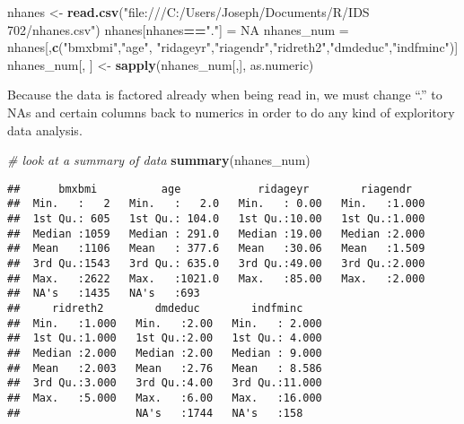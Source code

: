 \documentclass[]{article}
\newenvironment{Shaded}{\begin{snugshade}}{\end{snugshade}}
\newcommand{\KeywordTok}[1]{\textcolor[rgb]{0.13,0.29,0.53}{\textbf{#1}}}
\newcommand{\StringTok}[1]{\textcolor[rgb]{0.31,0.60,0.02}{#1}}
\newcommand{\CommentTok}[1]{\textcolor[rgb]{0.56,0.35,0.01}{\textit{#1}}}
\newcommand{\OtherTok}[1]{\textcolor[rgb]{0.56,0.35,0.01}{#1}}
\newcommand{\OperatorTok}[1]{\textcolor[rgb]{0.81,0.36,0.00}{\textbf{#1}}}
\newcommand{\NormalTok}[1]{#1}
\begin{document}
\begin{Shaded}
\begin{Highlighting}[]
\NormalTok{nhanes <-}\StringTok{ }\KeywordTok{read.csv}\NormalTok{(}\StringTok{"file:///C:/Users/Joseph/Documents/R/IDS 702/nhanes.csv"}\NormalTok{)}
\NormalTok{nhanes[nhanes}\OperatorTok{==}\StringTok{"."}\NormalTok{] =}\StringTok{ }\OtherTok{NA}
\NormalTok{nhanes_num =}\StringTok{ }\NormalTok{nhanes[,}\KeywordTok{c}\NormalTok{(}\StringTok{"bmxbmi"}\NormalTok{,}\StringTok{"age"}\NormalTok{, }\StringTok{"ridageyr"}\NormalTok{,}\StringTok{"riagendr"}\NormalTok{,}\StringTok{"ridreth2"}\NormalTok{,}\StringTok{"dmdeduc"}\NormalTok{,}\StringTok{"indfminc"}\NormalTok{)]}
\NormalTok{nhanes_num[, ] <-}\StringTok{ }\KeywordTok{sapply}\NormalTok{(nhanes_num[,], as.numeric)}
\end{Highlighting}
\end{Shaded}

Because the data is factored already when being read in, we must change
``.'' to NAs and certain columns back to numerics in order to do any
kind of exploritory data analysis.

\begin{Shaded}
\begin{Highlighting}[]
\CommentTok{# look at a summary of data}
\KeywordTok{summary}\NormalTok{(nhanes_num)}
\end{Highlighting}
\end{Shaded}

\begin{verbatim}
##      bmxbmi          age            ridageyr        riagendr    
##  Min.   :   2   Min.   :   2.0   Min.   : 0.00   Min.   :1.000  
##  1st Qu.: 605   1st Qu.: 104.0   1st Qu.:10.00   1st Qu.:1.000  
##  Median :1059   Median : 291.0   Median :19.00   Median :2.000  
##  Mean   :1106   Mean   : 377.6   Mean   :30.06   Mean   :1.509  
##  3rd Qu.:1543   3rd Qu.: 635.0   3rd Qu.:49.00   3rd Qu.:2.000  
##  Max.   :2622   Max.   :1021.0   Max.   :85.00   Max.   :2.000  
##  NA's   :1435   NA's   :693                                     
##     ridreth2        dmdeduc        indfminc     
##  Min.   :1.000   Min.   :2.00   Min.   : 2.000  
##  1st Qu.:1.000   1st Qu.:2.00   1st Qu.: 4.000  
##  Median :2.000   Median :2.00   Median : 9.000  
##  Mean   :2.003   Mean   :2.76   Mean   : 8.586  
##  3rd Qu.:3.000   3rd Qu.:4.00   3rd Qu.:11.000  
##  Max.   :5.000   Max.   :6.00   Max.   :16.000  
##                  NA's   :1744   NA's   :158
\end{verbatim}
\end{document}

